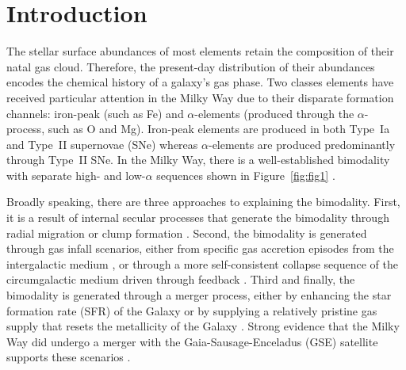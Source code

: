 \documentclass[twocolumn]{aastex631}
\begin{document}
\section{Introduction}\label{sec:intro}
The stellar surface abundances of most elements retain the composition of their natal gas cloud. Therefore, the present-day distribution of their abundances encodes the chemical history of a galaxy's gas phase. Two classes elements have received particular attention in the Milky Way due to their disparate formation channels: iron-peak (such as Fe) and $\alpha$-elements (produced through the $\alpha$-process, such as O and Mg). Iron-peak elements are produced in both Type~Ia and Type~II supernovae (SNe) whereas $\alpha$-elements are produced predominantly through Type~II SNe. In the Milky Way, there is a well-established bimodality with separate high- and low-$\alpha$ sequences shown in Figure~\ref{fig:fig1} \citep{1996ASPC...92..307G,1998A&A...338..161F,2004AN....325....3F,2006MNRAS.367.1329R,2011A&A...535L..11A,2012A&A...545A..32A,2014A&A...562A..71B,2014ApJ...796...38N,2020MNRAS.493.2952H}.

Broadly speaking, there are three approaches to explaining the bimodality. First, it is a result of internal secular processes that generate the bimodality through radial migration \citep{2009MNRAS.396..203S,2021MNRAS.507.5882S,2023MNRAS.523.3791C} or clump formation \citep{2019MNRAS.484.3476C,2020MNRAS.492.4716B,2021MNRAS.502..260B,2023ApJ...953..128G}. Second, the bimodality is generated through gas infall scenarios, either from specific gas accretion episodes from the intergalactic medium \citep{1997ApJ...477..765C,2009IAUS..254..191C,2017MNRAS.472.3637G,2019A&A...623A..60S}, or through a more self-consistent collapse sequence of the circumgalactic medium driven through feedback \citep{2021MNRAS.501.5176K}. Third and finally, the bimodality is generated through a merger process, either by enhancing the star formation rate (SFR) of the Galaxy \citep{2004ApJ...612..894B,2005ApJ...630..298B,2007ApJ...658...60B,2010MNRAS.402.1489R} or by supplying a relatively pristine gas supply that resets the metallicity of the Galaxy \citep{2020MNRAS.491.5435B,2024MNRAS.528L.122C}. Strong evidence that the Milky Way did undergo a merger with the Gaia-Sausage-Enceladus (GSE) satellite supports these scenarios \citep{2018MNRAS.478..611B,2018Natur.563...85H,2020ApJ...901...48N,2024ApJ...972..112C}.
\end{document}
